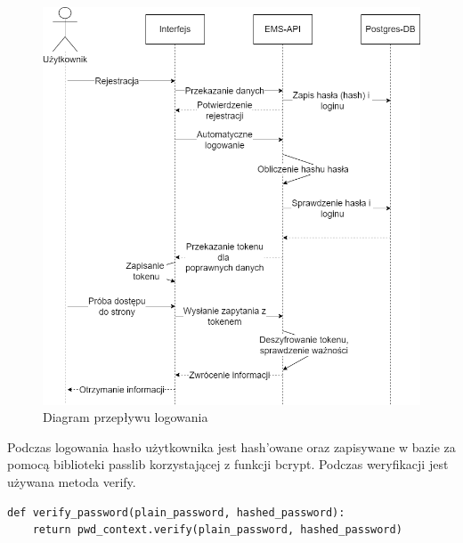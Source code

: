 \begin{figure}[H]
    \centering
    \includegraphics[width=0.75\linewidth]{img/sequence_login.png}
    \caption{Diagram przepływu logowania}
    \label{fig:seq-diag-login}
\end{figure}
Podczas logowania hasło użytkownika jest hash'owane oraz zapisywane w bazie za pomocą biblioteki passlib korzystającej z funkcji bcrypt. Podczas weryfikacji jest używana metoda verify.
\begin{verbatim}
def verify_password(plain_password, hashed_password):
    return pwd_context.verify(plain_password, hashed_password)
\end{verbatim}

